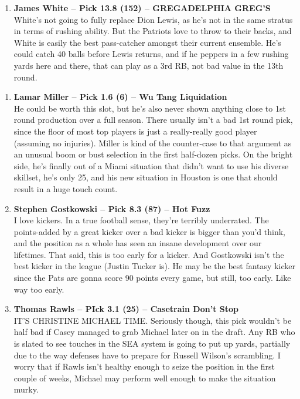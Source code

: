 \documentclass[11pt,letterpaper]{article}
\begin{document}
\begin{enumerate}
\item \textbf{James White -- Pick 13.8 (152) -- GREGADELPHIA GREG'S}
\\White's not going to fully replace Dion Lewis, as he's not in the same stratus in terms of rushing ability. But the Patriots love to throw to their backs, and White is easily the best pass-catcher amongst their current ensemble. He's could catch 40 balls before Lewis returns, and if he peppers in a few rushing yards here and there, that can play as a 3rd RB, not bad value in the 13th round.

\end{enumerate}

\begin{enumerate}
\item \textbf{Lamar Miller -- Pick 1.6 (6) -- Wu Tang Liquidation}
\\He could be worth this slot, but he's also never shown anything close to 1st round production over a full season. There usually isn't a bad 1st round pick, since the floor of most top players is just a really-really good player (assuming no injuries). Miller is kind of the counter-case to that argument as an unusual boom or bust selection in the first half-dozen picks. On the bright side, he's finally out of a Miami situation that didn't want to use his diverse skillset, he's only 25, and his new situation in Houston is one that should result in a huge touch count.

\item \textbf{Stephen Gostkowski -- Pick 8.3 (87) -- Hot Fuzz}
\\I love kickers. In a true football sense, they're terribly underrated. The points-added by a great kicker over a bad kicker is bigger than you'd think, and the position as a whole has seen an insane development over our lifetimes. That said, this is too early for a kicker. And Gostkowski isn't the best kicker in the league (Justin Tucker is). He may be the best fantasy kicker since the Pats are gonna score 90 points every game, but still, too early. Like way too early. 

\item \textbf{Thomas Rawls -- PIck 3.1 (25) -- Casetrain Don't Stop}
\\IT'S CHRISTINE MICHAEL TIME. Seriously though, this pick wouldn't be half bad if Casey managed to grab Michael later on in the draft. Any RB who is slated to see touches in the SEA system is going to put up yards, partially due to the way defenses have to prepare for Russell Wilson's scrambling. I worry that if Rawls isn't healthy enough to seize the position in the first couple of weeks, Michael may perform well enough to make the situation murky.


\end{enumerate}
\end{document}
